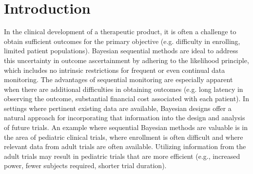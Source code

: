\documentclass[useAMS,usenatbib,referee]{biom}
\begin{document}

%

\section{Introduction}
In the clinical development of a therapeutic product, it is often a challenge to obtain sufficient outcomes for the primary objective (e.g. difficulty in enrolling, limited patient populations). Bayesian sequential methods are ideal to address this uncertainty in outcome ascertainment by adhering to the likelihood principle, which includes no intrinsic restrictions for frequent or even continual data monitoring. The advantages of sequential monitoring are especially apparent when there are additional difficulties in obtaining outcomes (e.g. long latency in observing the outcome, substantial financial cost associated with each patient). In settings where pertinent existing data are available, Bayesian designs offer a natural approach for incorporating that information into the design and analysis of future trials. An example where sequential Bayesian methods are valuable is in the area of pediatric clinical trials, where enrollment is often difficult and where relevant data from adult trials are often available. Utilizing information from the adult trials may result in pediatric trials that are more efficient (e.g., increased power, fewer subjects required, shorter trial duration).
\end{document}
